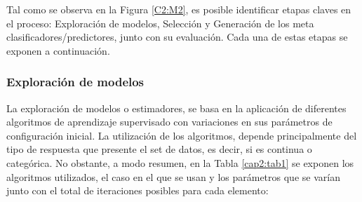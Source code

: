 Tal como se observa en la Figura \ref{C2:M2}, es posible identificar etapas claves en el proceso: Exploración de modelos, Selección y Generación de los meta clasificadores/predictores, junto con su evaluación. Cada una de estas etapas se exponen a continuación.

\subsubsection{Exploración de modelos}

La exploración de modelos o estimadores, se basa en la aplicación de diferentes algoritmos de aprendizaje supervisado con variaciones en sus parámetros de configuración inicial. La utilización de los algoritmos, depende principalmente del tipo de respuesta que presente el set de datos, es decir, si es continua o categórica. No obstante, a modo resumen, en la Tabla \ref{cap2:tab1} se exponen los algoritmos utilizados, el caso en el que se usan y los parámetros que se varían junto con el total de iteraciones posibles para cada elemento:

